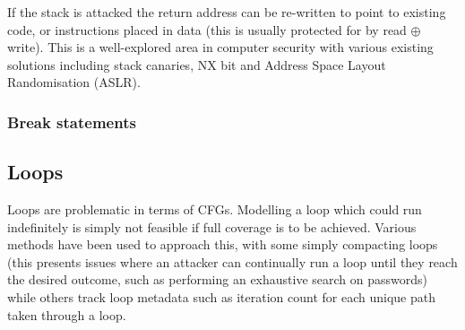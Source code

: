 If the stack is attacked the return address can be re-written to point to existing code, or instructions placed in data (this is usually protected for by read $\oplus$ write). This is a well-explored area in computer security with various existing solutions including stack canaries, NX bit and Address Space Layout Randomisation (ASLR).

\ifnotesincluded

\subsubsection{Break statements}


\fi

\subsection{Loops}
Loops are problematic in terms of CFGs. Modelling a loop which could run indefinitely is simply not feasible if full coverage is to be achieved. Various methods have been used to approach this, with some \cite{Abadi2005} simply compacting loops (this presents issues where an attacker can continually run a loop until they reach the desired outcome, such as performing an exhaustive search on passwords) while others \cite{Dessouky2017} track loop metadata such as iteration count for each unique path taken through a loop.